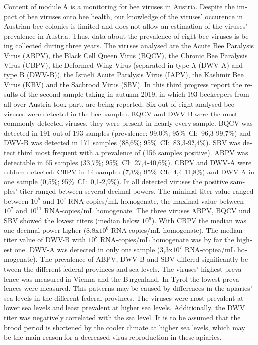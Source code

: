 \begin{otherlanguage}{english}

Content of module A is a monitoring for bee viruses in Austria. Despite the impact of bee viruses onto bee health, our knowledge of the viruses' occurence in Austrian bee colonies is limited and does not allow an estimation of the viruses' prevalence in Austria. Thus, data about the prevalence of eight bee viruses is being collected during three years. The viruses analysed are the Acute Bee Paralysis Virus (ABPV), the Black Cell Queen Virus (BQCV), the Chronic Bee Paralysis Virus (CBPV), the Deformed Wing Virus (separated in type A (DWV-A) and type B (DWV-B)), the Israeli Acute Paralysis Virus (IAPV), the Kashmir Bee Virus (KBV) and the Sacbrood Virus (SBV).
\newline
In this third progress report the results of the second sample taking in autumn 2019, in which 193 beekeepers from all over Austria took part, are being reported. Six out of eight analysed bee viruses were detected in the bee samples. BQCV and DWV-B were the most commonly detected viruses, they were present in nearly every sample. BQCV was detected in 191 out of 193 samples (prevalence: 99,0\%; 95\%~CI:~96,3-99,7\%) and DWV-B was detected in 171 samples (88,6\%; 95\%~CI:~83,3-92,4\%). SBV was detect third most frequent with a prevalence of  (156 samples positive). ABPV was detectable in 65 samples (33,7\%; 95\%~CI:~27,4-40,6\%). CBPV and DWV-A were  seldom detected: CBPV in 14 samples (7,3\%; 95\%~CI:~4,4-11,8\%) and DWV-A in one sample (0,5\%; 95\%~CI:~0,1-2,9\%). 
\newline
In all detected viruses the positive samples' titer ranged between several decimal powers. The minimal titer value ranged between $10^5$ and $10^9$ RNA-copies/\si{\milli\liter} homogenate, the maximal value between $10^7$ and $10^{11}$ RNA-copies/\si{\milli\liter} homogenate. The three viruses ABPV, BQCV und SBV showed the lowest titers (median below $10^6$). With CBPV the median was one decimal power higher (8,8x$10^6$ RNA-copies/\si{\milli\liter} homogenate). The median titer value of DWV-B  with $10^8$ RNA-copies/\si{\milli\liter} homogenate was by far the highest one. DWV-A was detected in only one sample (3,3x$10^7$ RNA-copiea/\si{\milli\liter} homogenate).
\newline
The prevalence of ABPV, DWV-B and SBV differed significantly between the different federal provinces and sea levels. The viruses' highest prevalence was measured in Vienna and the Burgenland. In Tyrol the lowest prevalences were measured. This patterns may be caused by differences in the apiaries' sea levels in the different federal provinces. The viruses were most prevalent at lower sea levels and least prevalent at higher sea levels. Additionally, the DWV titer was negatively correlated with the sea level. It is to be assumed that the brood period is shortened by the cooler climate at higher sea levels, which may be the main reason for a decreased virus reproduction in these apiaries.

\end{otherlanguage}
